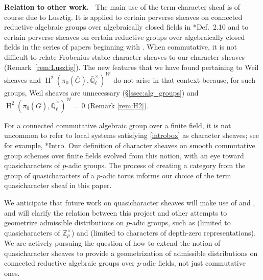 \documentclass[10pt]{amsart}
\theoremstyle{plain}
\theoremstyle{definition}
\newcommand{\ZZ}{{\mathbb{Z}}}
\newcommand{\EE}{\mathbb{\bar Q}_\ell}
\newcommand{\EEx}{\EE^\times}
\newcommand{\Weil}[1]{\mathcal{W}_{#1}}
\DeclareMathOperator{\Hh}{H}
\newcommand{\bG}{\bar{G}}
\begin{document}
\iffalse
By any measure, there are more quasicharacter sheaves for $T$ than quasicharacters of $T(K)$.  
In this regard, we are reminded of the work of David Vogan \cite{vogan:93a}, in which he finds a geometrization
of complete Langlands parameters for $p$-adic groups 
and, in the process, is led to study the representations of all the pure rational forms of the $p$-adic group, simultaneously.
A similar phenomenon appears in recent work by Joseph Bernstein in which his geometric Ansatz leads
to the study of certain sheaves on the stacky classifying space of the $p$-adic group, resulting in a category
which appears to be tied to the representations of all the pure rational forms of the $p$-adic group \cite{bernstein:vogan_conference}.
Indeed, Bernstein has suggested to us that our category of quasicharacters for $T$ may be tied to
quasicharacters of all the pure rational forms of $T$; we do not pursue that suggestion in this paper.
\fi

\medskip
\noindent\textbf{Relation to other work.\ }
The main use of the term character sheaf is of course due to Lusztig.
It is applied to certain perverse sheaves on connected reductive algebraic groups over algebraically closed fields in
\cite{lusztig:85a}*{Def.~2.10} and to certain perverse sheaves on certain reductive groups over algebraically closed fields in the series of papers
beginning with \cite{lusztig:disconnected1}.
When commutative, it is not difficult to relate Frobenius-stable character sheaves to our character sheaves
(Remark~\ref{rem:Lusztig}). The new features that we have found pertaining to Weil sheaves
and $\Hh^2(\pi_0(\bG),\EEx)^{\Weil{}}$ do not arise in that context because, for such groups,
Weil sheaves are unnecessary (\S \ref{ssec:alg_groups}) and $\Hh^2(\pi_0(\bG),\EEx)^{\Weil{}}=0$ (Remark \ref{rem:H2}).



For a connected commutative algebraic group over a finite field, it is not uncommon to refer to
local systems satisfying \eqref{introbox}  as character sheaves; see for example, \cite{kamgarpour:09a}*{Intro}.
Our definition of character sheaves on smooth commutative group schemes over finite fields evolved from this notion,
with an eye toward quasicharacters of $p$-adic groups.
The process of creating a category from the group of quasicharacters of a $p$-adic torus informs our choice of the
term quasicharacter sheaf in this paper.

We anticipate that future work on quasicharacter sheaves will make use of   \cite{suzuki-yoshida:12a} and \cite{Suzuki:Neron},
and will clarify the relation between this project and other attempts to geometrize admissible distributions on $p$-adic groups,
such as \cite{Cunningham-Kamgarpour} (limited to quasicharacters of $\ZZ_p^\times$) and \cite{Aubert-Cunningham}
(limited to characters of depth-zero representations). 
We are actively pursuing the question of how to extend the notion of quasicharacter sheaves to provide a geometrization
of admissible distributions on connected reductive algebraic groups over $p$-adic fields, not just commutative ones.
\end{document}
